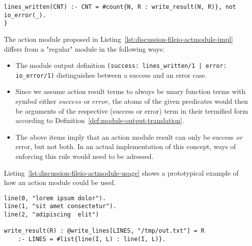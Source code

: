 \begin{example}
\begin{lstlisting}[style=asp-code, label={lst:discussion-fileio-actmodule-impl}, caption={Prototypical definition of a module containing Evolog actions.}]
	lines_written(CNT) :- CNT = #count{N, R : write_result(N, R)}, not io_error(_).		
}	
\end{lstlisting}	
The action module proposed in Listing~\ref{lst:discussion-fileio-actmodule-impl} differs from a "regular" module in the following ways:
\begin{itemize}
	\item The module output definition \texttt{(success: lines\_written/1 | error: io\_error/1)} distinguishes between a success and an error case. 
	\item Since we assume action result terms to always be unary function terms with symbol either $\mathit{success}$ or $\mathit{error}$, the atoms of the given predicates would then be arguments of the respective (success or error) term in their termified form according to Definition~\ref{def:module-output-translation}.
	\item The above items imply that an action module result can only be success \emph{or} error, but not both. In an actual implementation of this concept, ways of enforcing this rule would need to be adressed. 
\end{itemize}
Listing~\ref{lst:discussion-fileio-actmodule-usage} shows a prototypical example of how an action module could be used.
\begin{lstlisting}
line(0, "lorem ipsum dolor").
line(1, "sit amet consectetur").
line(2, "adipiscing  elit")

write_result(R) : @write_lines[LINES, "/tmp/out.txt"] = R 
	:- LINES = #list{line(I, L) : line(I, L)}.
\end{lstlisting}		
\end{example}




